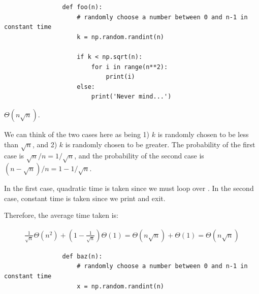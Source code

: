 \begin{prob}
\begin{subprobset}
\begin{subprob}
\begin{soln}
            \end{soln}
        \end{subprob}

        \begin{subprob}
            \begin{verbatim}
                def foo(n):
                    # randomly choose a number between 0 and n-1 in constant time
                    k = np.random.randint(n)

                    if k < np.sqrt(n):
                        for i in range(n**2):
                            print(i)
                    else:
                        print('Never mind...')

            \end{verbatim}

            \begin{soln}
                $\Theta(n\sqrt{n})$.

                We can think of the two cases here as being 1) $k$ is randomly chosen
                to be less than $\sqrt{n}$, and 2) $k$ is randomly chosen to be greater.
                The probability of the first case is $\sqrt{n} / n = 1/\sqrt{n}$, and
                the probability of the second case is $(n - \sqrt{n})/n = 1 - 1/\sqrt{n}$.

                In the first case, quadratic time is taken since we must loop over .
                In the second case, constant time is taken since we print 
                and exit.

                Therefore, the average time taken is:

                \begin{align*}
                    \frac{1}{\sqrt{n}} \Theta(n^2) + \left(1 - \frac{1}{\sqrt{n}}\right) \Theta(1)
                    =
                        \Theta(n\sqrt{n}) + \Theta(1)
                    =
                        \Theta(n\sqrt{n})
                \end{align*}

            \end{soln}
        \end{subprob}

        \begin{subprob}
            \begin{verbatim}
                def baz(n):
                    # randomly choose a number between 0 and n-1 in constant time
                    x = np.random.randint(n)


\end{verbatim}
\end{subprob}
\end{subprobset}
\end{prob}
